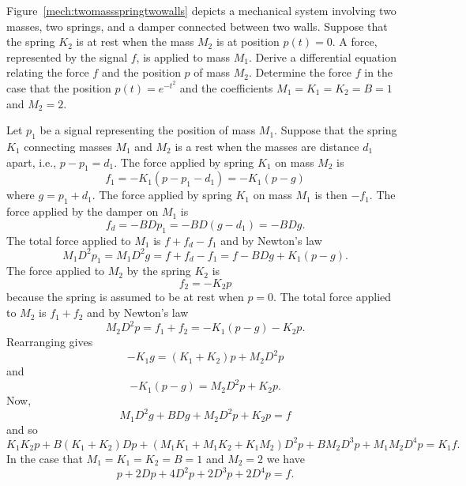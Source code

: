 \begin{excersizelist}
\begin{solution}
\end{solution}


\item \label{exer:twomassspringtwowalls} Figure~\ref{mech:twomassspringtwowalls} depicts a mechanical system involving two masses, two springs, and a damper connected between two walls.  Suppose that the spring $K_2$ is at rest when the mass $M_2$ is at position $p(t) = 0$.  A force, represented by the signal $f$, is applied to mass $M_1$.  Derive a differential equation relating the force $f$ and the position $p$ of mass $M_2$.  Determine the force $f$ in the case that the position $p(t) = e^{-t^2}$ and the coefficients $M_1 = K_1 = K_2 = B = 1$ and $M_2 = 2$.

\begin{solution}
Let $p_1$ be a signal representing the position of mass $M_1$.  Suppose that the spring $K_1$ connecting masses $M_1$ and $M_2$ is a rest when the masses are distance $d_1$ apart, i.e., $p - p_1 = d_1$.  The force applied by spring $K_1$ on mass $M_2$ is 
\[
f_1 = -K_1(p - p_1 - d_1) = -K_1(p - g)
\] 
where $g = p_1 + d_1$.  The force applied by spring $K_1$ on mass $M_1$ is then $-f_1$.  The force applied by the damper on $M_1$ is
\[
f_d = -BD p_1 = -BD(g - d_1) = - BD g.
\]
The total force applied to $M_1$ is $f + f_d - f_1$ and by Newton's law
\[
M_1 D^2 p_1 = M_1 D^2g = f + f_d - f_1 = f - BDg + K_1(p - g).
\]
The force applied to $M_2$ by the spring $K_2$ is
\[
f_2 = -K_2 p 
\] 
because the spring is assumed to be at rest when $p = 0$.  The total force applied to $M_2$ is $f_1 + f_2$ and by Newton's law
\[
M_2 D^2p = f_1 + f_2 =  -K_1(p - g) - K_2p.
\]
Rearranging gives
\[
-K_1 g = (K_1+K_2)p + M_2 D^2p
\]
and
\[
-K_1(p - g) = M_2 D^2p  + K_2p .
\]
Now,
\[
M_1 D^2g + BDg + M_2 D^2p  + K_2p = f 
\]
and so
\[
K_1K_2 p + B(K_1+K_2)Dp + (M_1K_1 + M_1K_2 + K_1 M_2) D^2p  + BM_2D^3p + M_1M_2 D^4p = K_1 f .
\]
In the case that $M_1 = K_1 = K_2 = B = 1$ and $M_2 = 2$ we have
\[
p + 2Dp + 4D^2p + 2D^3p + 2D^4p = f.
\]
\end{solution}

\begin{figure}[p]
\centering
{}
\end{figure}
\end{excersizelist}
